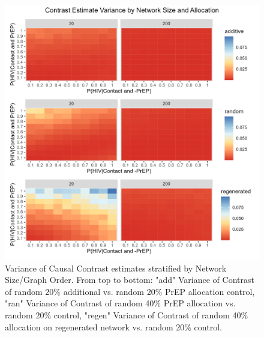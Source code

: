 \documentclass{article}
\theoremstyle{definition}
\begin{document}
\begin{figure}[H]
    \centering
    \includegraphics[scale=0.8]{Figures/Network Size Variance plots.png}
    \caption{Variance of Causal Contrast estimates stratified by Network Size/Graph Order. From top to bottom: "add" Variance of Contrast of random 20\% additional vs. random 20\% PrEP allocation control, "ran" Variance of Contrast of random 40\% PrEP allocation vs. random 20\% control, "regen" Variance of Contrast of random 40\% allocation on regenerated network vs. random 20\% control.}
    \label{fig:Figure 8}
\end{figure}
\end{document}
